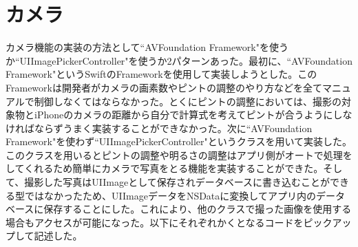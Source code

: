\section{カメラ}
カメラ機能の実装の方法として``AVFoundation Framework"を使うか``UIImagePickerController"を使うか2パターンあった。最初に、``AVFoundation Framework"というSwiftのFrameworkを使用して実装しようとした。このFrameworkは開発者がカメラの画素数やピントの調整のやり方などを全てマニュアルで制御しなくてはならなかった。とくにピントの調整においては、撮影の対象物とiPhoneのカメラの距離から自分で計算式を考えてピントが合うようにしなければならずうまく実装することができなかった。次に``AVFoundation Framework"を使わず``UIImagePickerController"というクラスを用いて実装した。このクラスを用いるとピントの調整や明るさの調整はアプリ側がオートで処理をしてくれるため簡単にカメラで写真をとる機能を実装することができた。そして、撮影した写真はUIImageとして保存されデータベースに書き込むことができる型ではなかったため、UIImageデータをNSDataに変換してアプリ内のデータベースに保存することにした。これにより、他のクラスで撮った画像を使用する場合もアクセスが可能になった。以下にそれぞれかくとなるコードをピックアップして記述した。

